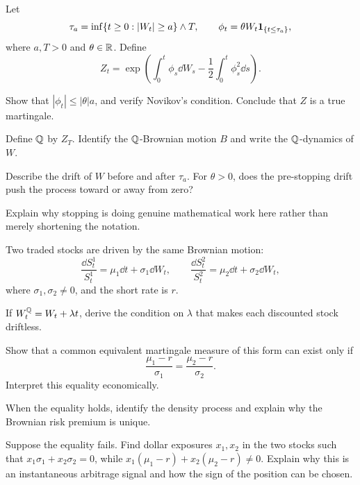 \begin{exercise}
Let
\[
\tau_a=\inf\{t\geq0:|W_t|\geq a\}\wedge T,
\qquad
\phi_t=\theta W_t\mathbf{1}_{\{t\leq\tau_a\}},
\]
where \(a,T>0\) and \(\theta\in\mathbb{R}\). Define
\[
Z_t=\exp\!\left(
\int_0^t\phi_s\dd W_s-\frac12\int_0^t\phi_s^2\dd s
\right).
\]
\begin{exparts}
  \item Show that \(|\phi_t|\leq|\theta|a\), and verify Novikov's condition.
  Conclude that \(Z\) is a true martingale.
  \item Define \(\mathbb Q\) by \(Z_T\). Identify the \(\mathbb Q\)-Brownian motion
  \(B\) and write the \(\mathbb Q\)-dynamics of \(W\).
  \item Describe the drift of \(W\) before and after \(\tau_a\). For
  \(\theta>0\), does the pre-stopping drift push the process toward or away
  from zero?
  \item Explain why stopping is doing genuine mathematical work here rather
  than merely shortening the notation.
\end{exparts}
\end{exercise}

\begin{exercise}
Two traded stocks are driven by the same Brownian motion:
\[
\frac{\dd S_t^1}{S_t^1}=\mu_1\dd t+\sigma_1\dd W_t,
\qquad
\frac{\dd S_t^2}{S_t^2}=\mu_2\dd t+\sigma_2\dd W_t,
\]
where \(\sigma_1,\sigma_2\neq0\), and the short rate is \(r\).
\begin{exparts}
  \item If \(W_t^{\mathbb Q}=W_t+\lambda t\), derive the condition on
  \(\lambda\) that makes each discounted stock driftless.
  \item Show that a common equivalent martingale measure of this form can
  exist only if
  \[
  \frac{\mu_1-r}{\sigma_1}
  =
  \frac{\mu_2-r}{\sigma_2}.
  \]
  Interpret this equality economically.
  \item When the equality holds, identify the density process and explain
  why the Brownian risk premium is unique.
  \item Suppose the equality fails. Find dollar exposures $x_1,x_2$ in the
  two stocks such that $x_1\sigma_1+x_2\sigma_2=0$, while
  $x_1(\mu_1-r)+x_2(\mu_2-r)\neq0$. Explain why this is an instantaneous
  arbitrage signal and how the sign of the position can be chosen.
\end{exparts}
\end{exercise}
\fi


